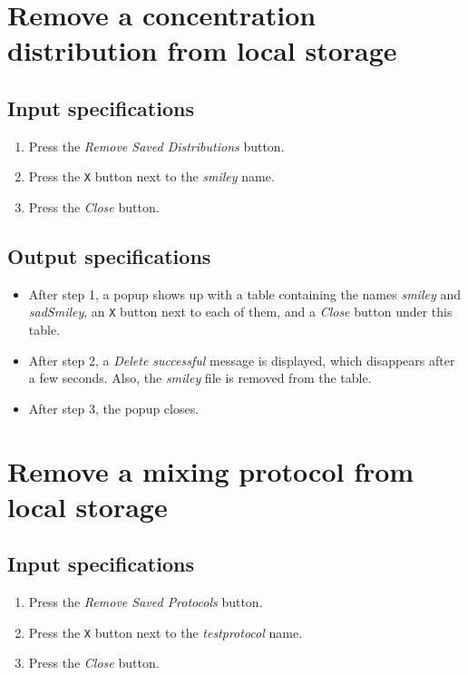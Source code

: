 \section{Remove a concentration distribution from local storage}

\subsection*{Input specifications}
\begin{enumerate}
\item Press the \emph{Remove Saved Distributions} button.
\item Press the \texttt{X} button next to the \emph{smiley} name.
\item Press the \emph{Close} button.
\end{enumerate}

\subsection*{Output specifications}
\begin{itemize}
\item After step 1, a popup shows up with a table containing the names \emph{smiley} and \emph{sadSmiley}, an \texttt{X} button next to each of them, and a \emph{Close} button under this table.
\item After step 2, a \emph{Delete successful} message is displayed, which disappears after a few seconds. Also, the \emph{smiley} file is removed from the table.
\item After step 3, the popup closes.
\end{itemize}

\section{Remove a mixing protocol from local storage}

\subsection*{Input specifications}
\begin{enumerate}
\item Press the \emph{Remove Saved Protocols} button.
\item Press the \texttt{X} button next to the \emph{testprotocol} name.
\item Press the \emph{Close} button.
\end{enumerate}

